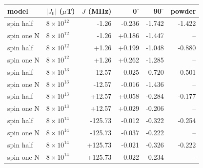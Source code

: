 \begin{tabular}{llrrrr}
\toprule
model & $|J_0|$ ($\mu$T) & $J$ (MHz) & 0$^\circ$ & 90$^\circ$ & powder \\
\midrule
spin half & $\ensuremath{8\times10^{12}}$ & -1.26 & -0.236 & -1.742 & -1.422 \\
spin one N & $\ensuremath{8\times10^{12}}$ & -1.26 & +0.186 & -1.447 & -- \\
spin half & $\ensuremath{8\times10^{12}}$ & +1.26 & +0.199 & -1.048 & -0.880 \\
spin one N & $\ensuremath{8\times10^{12}}$ & +1.26 & +0.262 & -1.285 & -- \\
spin half & $\ensuremath{8\times10^{13}}$ & -12.57 & -0.025 & -0.720 & -0.501 \\
spin one N & $\ensuremath{8\times10^{13}}$ & -12.57 & -0.016 & -1.436 & -- \\
spin half & $\ensuremath{8\times10^{13}}$ & +12.57 & +0.058 & -0.284 & -0.177 \\
spin one N & $\ensuremath{8\times10^{13}}$ & +12.57 & +0.029 & -0.206 & -- \\
spin half & $\ensuremath{8\times10^{14}}$ & -125.73 & -0.012 & -0.322 & -0.254 \\
spin one N & $\ensuremath{8\times10^{14}}$ & -125.73 & -0.037 & -0.222 & -- \\
spin half & $\ensuremath{8\times10^{14}}$ & +125.73 & -0.021 & -0.326 & -0.222 \\
spin one N & $\ensuremath{8\times10^{14}}$ & +125.73 & -0.022 & -0.234 & -- \\
\bottomrule
\end{tabular}
